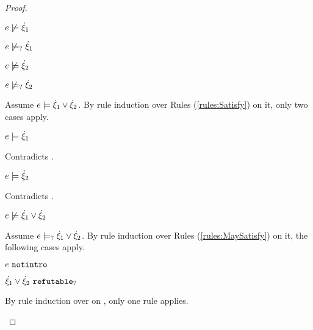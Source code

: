 \begin{proof}
\begin{byCases}
\begin{byCases}
\begin{pfsteps*}
        \item $e \not\models \dot{\xi}_1$  
        \item $e \not\models_{?} \dot{\xi}_1$  
        \item $e \not\models \dot{\xi}_2$  
        \item $e \not\models_{?} \dot{\xi}_2$  
        \end{pfsteps*}
        Assume $e \models \dot{\xi}_1 \vee \dot{\xi}_2$. By rule induction over Rules (\ref{rules:Satisfy}) on it, only two cases apply.
        \begin{byCases}
        \item[\text{(\ref{rule:CSOr1})}]
            \begin{pfsteps*}
            \item $e \models \dot{\xi}_1$ 
            \end{pfsteps*}
            Contradicts .
        \item[\text{(\ref{rule:CSOr2})}]
            \begin{pfsteps*}
            \item $e \models \dot{\xi}_2$ 
            \end{pfsteps*}
            Contradicts .
        \end{byCases}
        \begin{pfsteps*}
        \item $e \not\models \dot{\xi}_1 \vee \dot{\xi}_2$  
        \end{pfsteps*}
        Assume $e \models_{?} \dot{\xi}_1 \vee \dot{\xi}_2$. By rule induction over Rules (\ref{rules:MaySatisfy}) on it, the following cases apply.
        \begin{byCases}
        \item[\text{(\ref{rule:CMSNotIntro})}]
            \begin{pfsteps*}
            \item $e ~\mathtt{notintro}$  
            \item $\dot{\xi}_1 \vee \dot{\xi}_2 ~\mathtt{refutable}_?$  
            \end{pfsteps*}
            By rule induction over  on , only one rule applies.

\end{byCases}
\end{byCases}
\end{byCases}
\end{proof}
